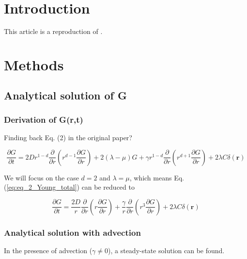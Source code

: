 
\section*{Introduction}
This article is a reproduction of \cite{young_reproductive_2001}.

\section*{Methods}

\subsection*{Analytical solution of G}
\subsubsection*{Derivation of G(r,t)}

Finding back Eq. (2) in the original paper?

\begin{equation}
\frac{\partial G}{\partial t}=2Dr^{1-d}\frac{\partial}{\partial r}\left(r^{d-1}\frac{\partial G}{\partial r}\right)+2(\lambda-\mu)G+\gamma r^{1-d}\frac{\partial}{\partial r}\left(r^{d+1}\frac{\partial G}{\partial r}\right)+2\lambda C\delta(\boldsymbol{r})\label{eq:eq_2_Young_total}
\end{equation}

We will focus on the case $d=2$ and $\lambda=\mu$, which means Eq.
(\ref{eq:eq_2_Young_total}) can be reduced to

\begin{equation}
\frac{\partial G}{\partial t}=\frac{2D}{r}\frac{\partial}{\partial r}\left(r\frac{\partial G}{\partial r}\right)+\frac{\gamma}{r}\frac{\partial}{\partial r}\left(r^{3}\frac{\partial G}{\partial r}\right)+2\lambda C\delta(\boldsymbol{r})\label{eq:eq_2_Young_reduced}
\end{equation}


\subsubsection*{Analytical solution with advection}

In the presence of advection ($\gamma\neq0$), a steady-state solution
can be found. 

